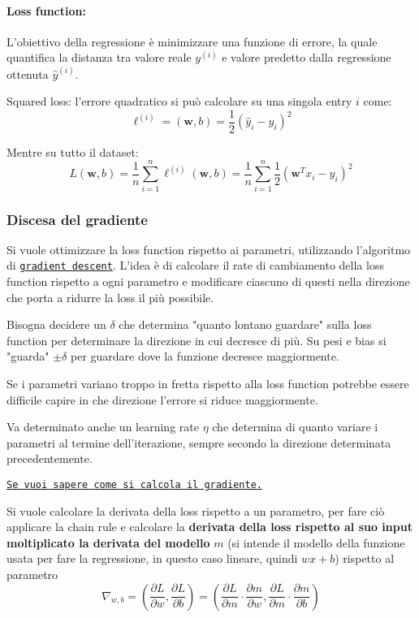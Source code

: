 \paragraph{Loss function:} L'obiettivo della regressione è minimizzare una funzione di errore, la quale quantifica la distanza tra valore reale $y^{(i)}$ e valore predetto dalla regressione ottenuta $\hat y^{(i)}$.

Squared loss: l'errore quadratico si può calcolare su una singola entry $i$ come:
$$ \ell^{(i)} = (\bm w, b) = \frac{1}{2}  \left(\hat y_i - y_i\right)^2 $$

Mentre su tutto il dataset:
$$ L (\bm w, b) = \frac{1}{n} \sum_{i=1}^{n} \ell^{(i)} (\bm w, b) = \frac{1}{n} \sum_{i=1}^{n} \frac{1}{2} \left(\bm w^T x_i - y_i \right)^2 $$


\subsubsection{Discesa del gradiente}

Si vuole ottimizzare la loss function rispetto ai parametri, utilizzando l'algoritmo di \href{https://it.wikipedia.org/wiki/Discesa_del_gradiente}{\texttt{gradient descent}}. L'idea è di calcolare il rate di cambiamento della loss function rispetto a ogni parametro e modificare ciascuno di questi nella direzione che porta a ridurre la loss il più possibile.

Bisogna decidere un $\delta$ che determina "quanto lontano guardare" sulla loss function per determinare la direzione in cui decresce di più. Su pesi e bias si "guarda" $\pm \delta$ per guardare dove la funzione decresce maggiormente.

Se i parametri variano troppo in fretta rispetto alla loss function potrebbe essere difficile capire in che direzione l'errore si riduce maggiormente.

Va determinato anche un learning rate $\eta$ che determina di quanto variare i parametri al termine dell'iterazione, sempre secondo la direzione determinata precedentemente.

\href{it.wikipedia.org/wiki/Gradiente}{\texttt{Se vuoi sapere come si calcola il gradiente.}}

Si vuole calcolare la derivata della loss rispetto a un parametro, per fare ciò applicare la chain rule e calcolare la \textbf{derivata della loss rispetto al suo input moltiplicato la derivata del modello} $m$ (si intende il modello della funzione usata per fare la regressione, in questo caso lineare, quindi $wx + b$) rispetto al parametro
$$ \nabla_{w,b} = \left( \frac{\partial L}{\partial w}, \frac{\partial L}{\partial b}\right) = \left(\frac{\partial L}{\partial m} \cdot \frac{\partial m}{\partial w}, \frac{\partial L}{\partial m} \cdot \frac{\partial m}{\partial b}\right) $$

